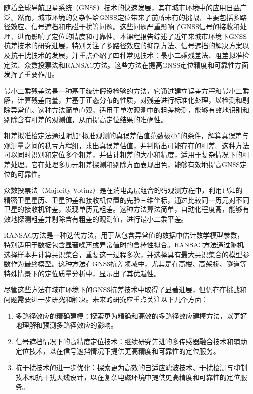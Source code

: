 \documentclass[12pt,hyperref,a4paper,UTF8]{ctexart}
\begin{document}
随着全球导航卫星系统（GNSS）技术的快速发展，其在城市环境中的应用日益广泛。然而，城市环境的复杂性给GNSS定位带来了前所未有的挑战，主要包括多路径效应、信号遮挡和电磁干扰等问题。这些问题严重影响了GNSS信号的接收和处理，进而影响了定位的精度和可靠性。本课程报告综述了近年来城市环境下GNSS抗差技术的研究进展，特别关注了多路径效应的抑制方法、信号遮挡的解决方案以及抗干扰技术的发展，并重点介绍了四种常见技术：最小二乘残差法、粗差拟准检定法、众数投票法和RANSAC方法。这些方法在提高GNSS定位精度和可靠性方面发挥了重要作用。

最小二乘残差法是一种基于统计假设检验的方法，它通过建立误差方程和最小二乘解，计算残差向量，并基于正态分布的性质，对残差进行标准化处理，以检测和剔除异常值。这种方法简单直观，适用于单次观测中的粗差检测，能够有效地识别和剔除含有粗差的观测值，从而提高定位结果的准确性。

粗差拟准检定法通过附加“拟准观测的真误差估值范数极小”的条件，解算真误差与观测量之间的秩亏方程组，求出真误差估值，并判断出可能存在的粗差。这种方法可以同时识别和定位多个粗差，并估计粗差的大小和精度，适用于复杂情况下的粗差处理。它在处理多历元粗差探测和剔除方面表现出色，能够有效地提高GNSS定位的可靠性。

众数投票法（Majority Voting）是在消电离层组合的码观测方程中，利用已知的精密卫星星历、卫星钟差和接收机位置的先验三维坐标，通过比较同一历元对不同卫星的接收机钟差，发现单历元粗差。这种方法算法简单，自动化程度高，能够有效地探测粗差并剔除含有粗差的观测值，进行最小二乘平差。

RANSAC方法是一种迭代方法，用于从包含异常值的数据中估计数学模型参数，特别适用于数据包含显著噪声或异常值时的鲁棒性拟合。RANSAC方法通过随机选择样本并计算共识集合，重复这一过程多次，并选择具有最大共识集合的模型参数作为最终模型。这种方法在GNSS抗差领域中，尤其是在高楼、高架桥、隧道等特殊情景下的定位质量分析中，显示出了其优越性。

尽管这些方法在城市环境下的GNSS抗差技术中取得了显著进展，但仍存在挑战和问题需要进一步研究和解决。未来的研究应重点关注以下几个方面：

\begin{enumerate}
    \item 多路径效应的精确建模：探索更为精确和高效的多路径效应建模方法，以更好地理解和预测多路径效应的影响。
    \item 信号遮挡情况下的高精度定位技术：继续研究先进的多传感器融合技术和辅助定位技术，以在信号遮挡情况下提供更高精度和可靠性的定位服务。
    \item 抗干扰技术的进一步优化：探索更为高效的自适应滤波技术、干扰检测与抑制技术和抗干扰天线设计，以在复杂电磁环境中提供更高精度和可靠性的定位服务。
\end{enumerate}
\end{document}
